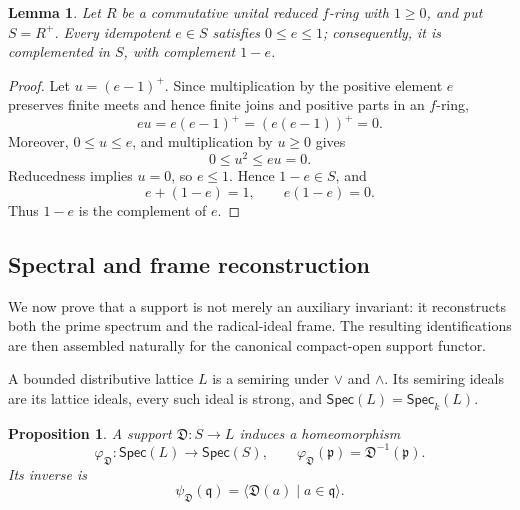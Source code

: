\documentclass[12pt,leqno]{amsart}
\newcommand{\Spec}{\mathsf{Spec}}
\newcommand{\Speck}{\mathsf{Spec}_{k}}
\newtheorem{proposition}[theorem]{Proposition}
\newtheorem{lemma}[theorem]{Lemma}
\theoremstyle{definition}
\numberwithin{equation}{section}
\theoremstyle{remark}
\def\leq{\leqslant}
\begin{document}
\begin{lemma}\label{lem:f-ring-idempotents}
Let $R$ be a commutative unital reduced $f$-ring with \(1\geq0\), and put \(S=R^+\). Every idempotent \(e\in S\) satisfies \(0\leq e\leq1\); consequently, it is complemented in $S$, with complement \(1-e\).
\end{lemma}

\begin{proof}
Let \(u=(e-1)^+\). Since multiplication by the positive element $e$ preserves finite meets and hence finite joins and positive parts in an $f$-ring,
\[
eu=e(e-1)^+=(e(e-1))^+=0.
\]
Moreover, \(0\leq u\leq e\), and multiplication by $u\geq0$ gives
\[
0\leq u^2\leq eu=0.
\]
Reducedness implies $u=0$, so $e\leq1$. Hence \(1-e\in S\), and
\[
e+(1-e)=1,\qquad e(1-e)=0.
\]
Thus $1-e$ is the complement of $e$.
\end{proof}

\subsection{Spectral and frame reconstruction}

We now prove that a support is not merely an auxiliary invariant: it reconstructs both the prime spectrum and the radical-ideal frame. The resulting identifications are then assembled naturally for the canonical compact-open support functor.

A bounded distributive lattice $L$ is a semiring under \(\vee\) and \(\wedge\). Its semiring ideals are its lattice ideals, every such ideal is strong, and
\(\Spec(L)=\Speck(L)\).

\begin{proposition}\label{prop:support-spectrum-homeomorphism}
A support \(\mathfrak D\colon S\to L\) induces a homeomorphism
\[
\varphi_{\mathfrak D}\colon\Spec(L)\longrightarrow\Spec(S),
\qquad
\varphi_{\mathfrak D}(\mathfrak p)=\mathfrak D^{-1}(\mathfrak p).
\]
Its inverse is
\[
\psi_{\mathfrak D}(\mathfrak q)
 =\bigl\langle\mathfrak D(a)\mid a\in\mathfrak q\bigr\rangle.
\]
\end{proposition}
\end{document}
